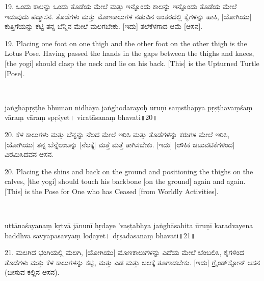 \begin{kan}
19.	ಒಂದು ಕಾಲನ್ನು ಒಂದು ತೊಡೆಯ ಮೇಲೆ ಮತ್ತು ಇನ್ನೊಂದು ಕಾಲನ್ನು ಇನ್ನೊಂದು ತೊಡೆಯ ಮೇಲೆ ಇಡುವುದು ಪದ್ಮಾಸನ. ತೊಡೆಗಳು ಮತ್ತು ಮೊಣಕಾಲುಗಳ ನಡುವಿನ ಅಂತರದಲ್ಲಿ ಕೈಗಳನ್ನು ಹಾಕಿ, [ಯೋಗಿಯು] ಕುತ್ತಿಗೆಯನ್ನು ಕಟ್ಟಿ ತನ್ನ ಬೆನ್ನಿನ ಮೇಲೆ ಮಲಗಬೇಕು. [ಇದು] ತಲೆಕೆಳಗಾದ ಆಮೆ [ಆಸನ].
\end{kan}
\bigskip

\begin{eng}
19. Placing one foot on one thigh and the other foot on the other thigh is the Lotus Pose. Having passed the hands in the gaps between the thighs and knees, [the yogi] should clasp the neck  and lie on his back. [This] is the Upturned Turtle [Pose].
\end{eng}
\newpage

~\vskip 1cm

\dummyimage
\begin{sans}
jaṅghāpṛṣṭhe\endnote{°pṛṣṭhe~] \textit{emend.}, °pṛṣṭhau M.} bhūmau nidhāya jaṅghodarayoḥ ūruṇī saṃsthāpya pṛṣṭhavaṃśaṃ vāraṃ vāraṃ spṛśyet\endnote{spṛśyet~] \textit{corr.},  spṛśet M.}। viratāsanaṃ  bhavati॥20॥
\end{sans}
\bigskip

\begin{kan}
20.	ಕೆಳ ಕಾಲುಗಳು ಮತ್ತು ಬೆನ್ನನ್ನು ನೆಲದ ಮೇಲೆ ಇರಿಸಿ ಮತ್ತು ತೊಡೆಗಳನ್ನು ಕರುಗಳ ಮೇಲೆ ಇರಿಸಿ, [ಯೋಗಿಯು] ತನ್ನ ಬೆನ್ನೆಲುಬನ್ನು [ನೆಲಕ್ಕೆ] ಮತ್ತೆ ಮತ್ತೆ ತಾಗಿಸಬೇಕು. [ಇದು] [ಲೌಕಿಕ ಚಟುವಟಿಕೆಗಳಿಂದ] ವಿರಮಿಸಿದವನ ಆಸನ.
\end{kan}
\bigskip

\begin{eng}
20. Placing the shins and back on the ground and positioning the thighs on the calves, [the yogi] should touch his backbone [on the ground] again and again. [This] is the Pose for One who has Ceased [from Worldly Activities].
\end{eng}
\newpage

~\vskip 1cm

\dummyimage
\begin{sans}
uttānaśayanaṃ kṛtvā jānunī hṛdaye 'vaṣṭabhya jaṅghāsahita ūruṇī karadvayena\endnote{°dvayena~] \textit{conj.}, °dvaye M.}  baddhvā savyāpasavyaṃ loḍayet। dṛṣadāsanaṃ bhavati॥21॥
\end{sans}
\bigskip

\begin{kan}
21.	ಮಲಗಿದ ಭಂಗಿಯಲ್ಲಿ ಮಲಗಿ, [ಯೋಗಿಯು] ಮೊಣಕಾಲುಗಳನ್ನು ಎದೆಯ ಮೇಲೆ ಬೆಂಬಲಿಸಿ, ಕೈಗಳಿಂದ ತೊಡೆಗಳು ಮತ್ತು ಕೆಳ ಕಾಲುಗಳನ್ನು ಕಟ್ಟಿ, ಮತ್ತು ಎಡ ಮತ್ತು ಬಲಕ್ಕೆ ತೂಗಾಡಬೇಕು. [ಇದು] ಗ್ರೈಂಡ್‌ಸ್ಟೋನ್ ಆಸನ (ಬೀಸುವ ಕಲ್ಲಿನ ಆಸನ).
\end{kan}
\bigskip

